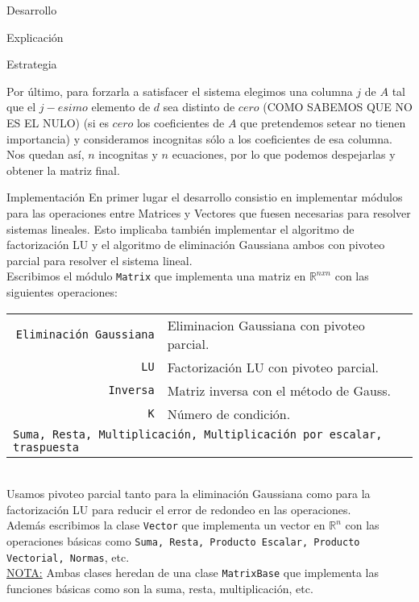 \begin{section}{Desarrollo}
\begin{subsection}{Explicación}
\begin{subsubsection}{Estrategia}
\begin{enumerate}
			Por último, para forzarla a satisfacer el sistema elegimos una columna $j$ de $A$ tal que el $j-esimo$ elemento de $d$ sea distinto de $cero$ (COMO SABEMOS QUE NO ES EL NULO) (si es $cero$ los coeficientes de $A$ que pretendemos setear no tienen importancia) y consideramos incognitas sólo a los coeficientes de esa columna. Nos quedan así, $n$ incognitas y $n$ ecuaciones, por lo que podemos despejarlas y obtener la matriz final.
			\end{enumerate}
		\end{subsubsection}
	\end{subsection}
	\begin{subsection}{Implementación}
		En primer lugar el desarrollo consistio en implementar módulos para las operaciones entre Matrices y Vectores que fuesen necesarias para resolver sistemas lineales. Esto implicaba también implementar el algoritmo de factorización LU y el algoritmo de eliminación Gaussiana ambos con pivoteo parcial para resolver el sistema lineal.\\
		
		Escribimos el módulo \texttt{Matrix} que implementa una matriz en $\mathbb{R}^{nxn}$ con las siguientes operaciones:\\
		
		\begin{tabular}{rl}
			\texttt{Eliminación Gaussiana} & Eliminacion Gaussiana con pivoteo parcial.\\
			\texttt{LU} & Factorización LU con pivoteo parcial.\\
			\texttt{Inversa} & Matriz inversa con el método de Gauss.\\
			\texttt{K} & Número de condición.\\
			\multicolumn{2}{l}{
				\texttt{Suma, Resta, Multiplicación, Multiplicación por escalar, traspuesta}
			}
		\end{tabular}\\
		
		Usamos pivoteo parcial tanto para la eliminación Gaussiana como para la factorización LU para reducir el error de redondeo en las operaciones.\\
		
		Además escribimos la clase \texttt{Vector} que implementa un vector en $\mathbb{R}^n$ con las operaciones básicas como \texttt{Suma, Resta,
		Producto Escalar, Producto Vectorial, Normas}, etc.\\
		
		\underline{NOTA:} Ambas clases heredan de una clase \texttt{MatrixBase} que implementa las funciones básicas como son la suma, resta, multiplicación, etc.\\
		

\end{subsection}
\end{section}
